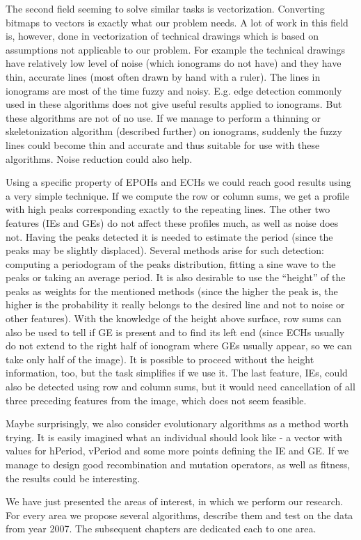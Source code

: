 The second field seeming to solve similar tasks is vectorization. Converting bitmaps to vectors is exactly what our problem needs. A lot of work in this field is, however, done in vectorization of technical drawings which is based on assumptions not applicable to our problem. For example the technical drawings have relatively low level of noise (which ionograms do not have) and they have thin, accurate lines (most often drawn by hand with a ruler). The lines in ionograms are most of the time fuzzy and noisy. E.g. edge detection commonly used in these algorithms does not give useful results applied to ionograms. But these algorithms are not of no use. If we manage to perform a thinning or skeletonization algorithm (described further) on ionograms, suddenly the fuzzy lines could become thin and accurate and thus suitable for use with these algorithms. Noise reduction could also help.

Using a specific property of EPOHs and ECHs we could reach good results using a very simple technique. If we compute the row or column sums, we get a profile with high peaks corresponding exactly to the repeating lines. The other two features (IEs and GEs) do not affect these profiles much, as well as noise does not. Having the peaks detected it is needed to estimate the period (since the peaks may be slightly displaced). Several methods arise for such detection: computing a periodogram of the peaks distribution, fitting a sine wave to the peaks or taking an average period. It is also desirable to use the ``height'' of the peaks as weights for the mentioned methods (since the higher the peak is, the higher is the probability it really belongs to the desired line and not to noise or other features). With the knowledge of the height above surface, row sums can also be used to tell if GE is present and to find its left end (since ECHs usually do not extend to the right half of ionogram where GEs usually appear, so we can take only half of the image). It is possible to proceed without the height information, too, but the task simplifies if we use it. The last feature, IEs, could also be detected using row and column sums, but it would need cancellation of all three preceding features from the image, which does not seem feasible. 

Maybe surprisingly, we also consider evolutionary algorithms as a method worth trying. It is easily imagined what an individual should look like - a vector with values for hPeriod, vPeriod and some more points defining the IE and GE. If we manage to design good recombination and mutation operators, as well as fitness, the results could be interesting.

We have just presented the areas of interest, in which we perform our research. For every area we propose several algorithms, describe them and test on the data from year 2007. The subsequent chapters are dedicated each to one area.